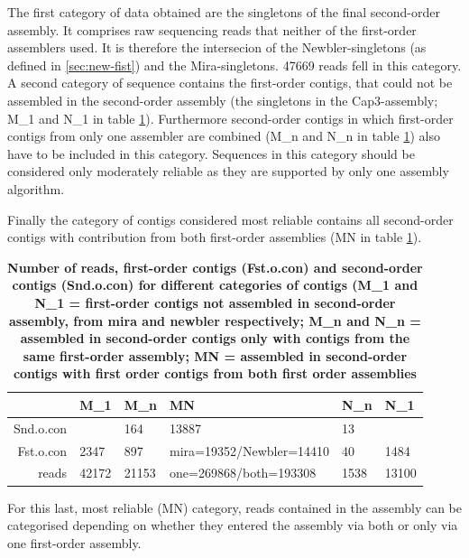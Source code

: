 \documentclass[12pt,a4paper]{article}
\begin{document}
The first category of data obtained are the singletons of the final
second-order assembly. It comprises raw sequencing reads that neither
of the first-order assemblers used. It is therefore the intersecion of
the Newbler-singletons (as defined in \ref{sec:new-fist}) and the
Mira-singletons. 47669 reads fell in this category. A
second category of sequence contains the first-order contigs, that
could not be assembled in the second-order assembly (the singletons in
the Cap3-assembly; M\_1 and N\_1 in table
\ref{tab:categ}). Furthermore second-order contigs in which
first-order contigs from only one assembler are combined (M\_n and
N\_n in table \ref{tab:categ}) also have to be included in this
category. Sequences in this category should be considered only
moderately reliable as they are supported by only one assembly
algorithm.

Finally the category of contigs considered most reliable contains all
second-order contigs with contribution from both first-order
assemblies (MN in table \ref{tab:categ}).

\begin{table}[ht]
\begin{center}
\begin{tabular}{rlllll}
  \hline
 & M\_1 & M\_n & MN & N\_n & N\_1 \\ 
  \hline
Snd.o.con &   & 164 & 13887 & 13 &   \\ 
  Fst.o.con & 2347 & 897 & mira=19352/Newbler=14410 & 40 & 1484 \\ 
  reads & 42172 & 21153 & one=269868/both=193308 & 1538 & 13100 \\ 
   \hline
\end{tabular}
\caption{\small{\textbf{Number of reads, first-order contigs (Fst.o.con) and second-order contigs (Snd.o.con) for different categories of contigs (M\_1 and N\_1 = first-order contigs not assembled in second-order assembly, from mira and newbler respectively; M\_n and N\_n =  assembled in second-order contigs only with contigs from the same first-order assembly; MN = assembled in second-order contigs with first order contigs from both first order assemblies}}}
\label{tab:categ}
\end{center}
\end{table}
For this last, most reliable (MN) category, reads contained in the
assembly can be categorised depending on whether they entered the
assembly via both or only via one first-order assembly.
\end{document}
